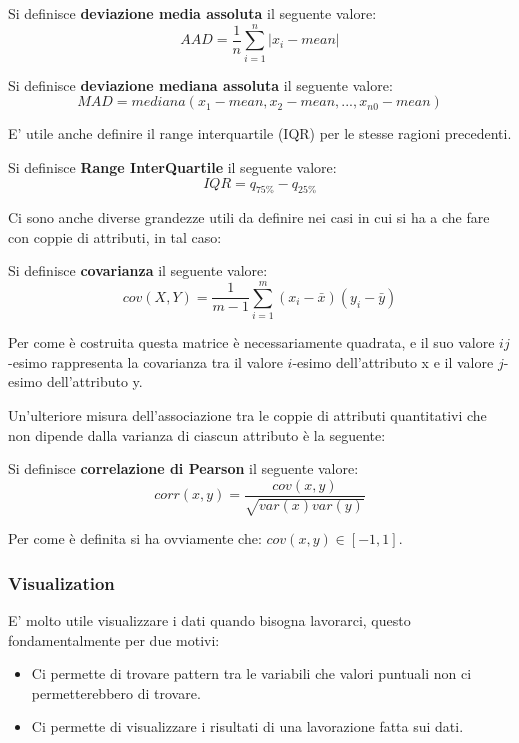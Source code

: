 \begin{defn}
	Si definisce \textbf{deviazione media assoluta} il seguente valore:
	\[ AAD =  \frac{1}{n}\sum_{i=1}^{n}|x_i- mean|\]
\end{defn}

\begin{defn}
	Si definisce \textbf{deviazione mediana assoluta} il seguente valore:
	\[ MAD = mediana(x_{1}-mean, x_{2}-mean, ..., x_{n0}-mean )\]
\end{defn}

E' utile anche definire il range interquartile (IQR) per le stesse ragioni precedenti.

\begin{defn}
	Si definisce \textbf{Range InterQuartile} il seguente valore:
	\[ IQR = q_{75\%} - q_{25\%}\]
\end{defn}

Ci sono anche diverse grandezze utili da definire nei casi in cui si ha a che fare con coppie di attributi, in tal caso:

\begin{defn}
	Si definisce \textbf{covarianza} il seguente valore:
\[cov(X,Y) = \frac{1}{m -1}\sum_{i = 1}^{m} (x_{i} - \bar{x})(y_{i} - \bar{y})\]
\end{defn}

Per come è costruita questa matrice è necessariamente quadrata, e il suo valore $ij$-esimo rappresenta la covarianza tra il valore $i$-esimo dell'attributo x e il valore $j$-esimo dell'attributo y.

Un'ulteriore misura dell'associazione tra le coppie di attributi quantitativi che non dipende dalla varianza di ciascun attributo è la seguente:

\begin{defn}
	Si definisce \textbf{correlazione di Pearson} il seguente valore:
	\[ corr(x,y) = \frac{cov(x,y)}{\sqrt{var(x)var(y)}}\]
\end{defn} 
Per come è definita si ha ovviamente che: $cov(x,y) \in [-1,1]$.

\subsubsection{Visualization}
E' molto utile visualizzare i dati quando bisogna lavorarci, questo fondamentalmente per due motivi:
\begin{itemize}
	\item Ci permette di trovare pattern tra le variabili che valori puntuali non ci permetterebbero di trovare.
	\item Ci permette di visualizzare i risultati di una lavorazione fatta sui dati.
\end{itemize}

